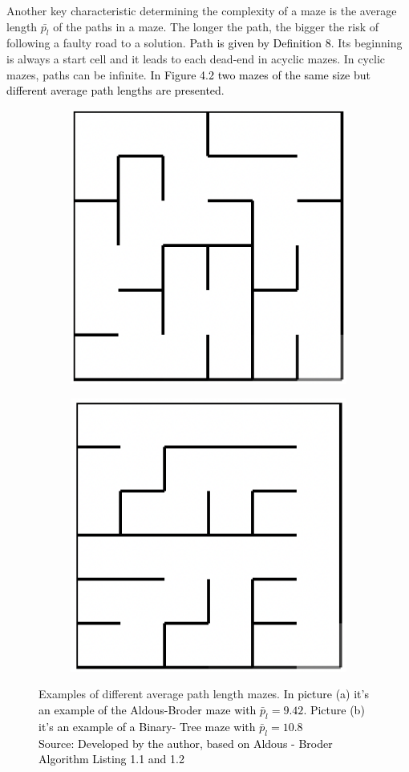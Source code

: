 \newline
Another key characteristic determining the complexity of a maze is the average length $\bar{p_l}$ of the paths in a maze. The longer the path, the bigger the risk of following a faulty road to a solution. \textcolor{black}{Path is given by Definition 8}. Its beginning is always a start cell and it leads to each dead-end in acyclic mazes. In cyclic mazes, paths can be infinite. \textcolor{black}{In Figure 4.2 two mazes of the same size but different average path lengths are presented}.
\newline
\begin{figure}[!h]
\centering
\begin{subfigure}{.5\textwidth}
\centering
\includegraphics[width=.5\linewidth]{aldous}
\caption{}
\label{fig:sub1}
\end{subfigure}%
\begin{subfigure}{.5\textwidth}
\centering
\includegraphics[width=.5\linewidth]{binary}
\caption{}
\label{fig:sub2}
\end{subfigure}
\caption{Examples of different average path length mazes. \textcolor{black}{In picture (a) it's an example of the Aldous-Broder maze with $\bar{p}_l = 9.42$. Picture (b) it's an example of a Binary- Tree maze with $\bar{p}_l = 10.8$\\ Source: Developed by the author,  based on Aldous - Broder Algorithm Listing 1.1 and 1.2 }}
\label{fig:test}
\end{figure}

